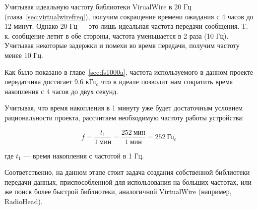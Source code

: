 Учитывая идеальную частоту библиотеки VirualWire в 20 Гц (глава~\ref{sec:virtualwirefreq}), получим сокращение времени ожидания с 4 часов до 12 минут. Однако 20 Гц --- это лишь идеальная частота передачи сообщения. Т. к. сообщение летит в обе стороны, частота уменьшается в 2 раза (10 Гц). Учитывая некоторые задержки и помехи во время передачи, получим частоту менее 10 Гц.

Как было показано в главе~\ref{sec:fs1000a}, частота используемого в данном проекте передатчика достигает 9.6 кГц, что в идеале позволит нам сократить время накопления с 4 часов до двух секунд.

Учитывая, что время накопления в 1 минуту уже будет достаточным условием рациональности проекта, рассчитаем необходимую частоту работы устройства:

$$f = \frac{t_1}{1~\textrm{мин}} = \frac{252~\textrm{мин}}{1~\textrm{мин}} = 252~\textrm{Гц},$$

где $t_1$ --- время накопления с частотой в 1 Гц.

Соответственно, на данном этапе стоит задача создания собственной библиотеки передачи данных, приспособленной для использования на больших частотах, или же поиск более быстрой библиотеки, аналогичной VirtualWire (например, RadioHead).
